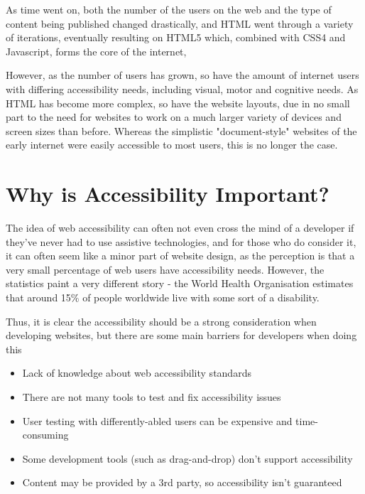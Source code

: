 \documentclass[ %
                    author={Aleena Baig},
                supervisor={Dr Simon Lock},
                    degree={BSc},
                     title={On Making Web Accessible Graphs},
                  subtitle={},
                      year={2019} ]{dissertation}
\begin{document}
As time went on, both the number of the users on the web and the type of content being published changed drastically, and HTML went through a variety of iterations, eventually resulting on HTML5 which, combined with CSS4 and Javascript, forms the core of the internet,

However, as the number of users has grown, so have the amount of internet users with differing accessibility needs, including visual, motor and cognitive needs. As HTML has become more complex, so have the website layouts, due in no small part to the need for websites to work on a much larger variety of devices and screen sizes than before. Whereas the simplistic "document-style" websites of the early internet were easily accessible to most users, this is no longer the case.


\section{Why is Accessibility Important?}

The idea of web accessibility can often not even cross the mind of a developer if they've never had to use assistive technologies, and for those who do consider it, it can often seem like a minor part of website design, as the perception is that a very small percentage of web users have accessibility needs.
However, the statistics paint a very different story - the World Health Organisation estimates that around 15\% of people worldwide live with some sort of a disability. \cite{WHOdisability}

Thus, it is clear the accessibility should be a strong consideration when developing websites, but there are some main barriers for developers when doing this

\begin{itemize}
    \item Lack of knowledge about web accessibility standards
    \item There are not many tools to test and fix accessibility issues
    \item User testing with differently-abled users can be expensive and time-consuming
    \item Some development tools (such as drag-and-drop) don't support accessibility
    \item Content may be provided by a 3rd party, so accessibility isn't guaranteed
\end{itemize}
\end{document}
